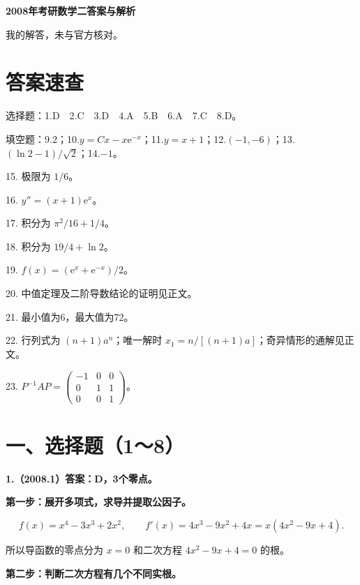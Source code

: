 \documentclass[UTF8,11pt,fontset=windows]{ctexart}
\begin{document}
{\LARGE\bfseries 2008年考研数学二答案与解析\par}\vspace{6pt}

\begingroup\color{gray}我的解答，未与官方核对。\par\endgroup

\section*{答案速查}

\begingroup\color{gray}选择题：1.D　2.C　3.D　4.A　5.B　6.A　7.C　8.D。\par\endgroup

\begingroup\color{gray}填空题：9.$2$；10.$y=Cx-x\mathrm e^{-x}$；11.$y=x+1$；12.$(-1,-6)$；13.$(\ln2-1)/\sqrt2$；14.$-1$。\par\endgroup

15. 极限为 $1/6$。

16. $y''=(x+1)\mathrm e^x$。

17. 积分为 $\pi^2/16+1/4$。

18. 积分为 $19/4+\ln2$。

19. $f(x)=(\mathrm e^x+\mathrm e^{-x})/2$。

20. 中值定理及二阶导数结论的证明见正文。

21. 最小值为6，最大值为72。

22. 行列式为 $(n+1)a^n$；唯一解时 $x_1=n/[(n+1)a]$；奇异情形的通解见正文。

23. $P^{-1}AP=\begin{pmatrix}-1&0&0\\0&1&1\\0&0&1\end{pmatrix}$。

\clearpage

\section*{一、选择题（1～8）}

\textbf{1.（2008.1）答案：D，3个零点。}

\textbf{第一步：展开多项式，求导并提取公因子。}

$$
f(x)=x^4-3x^3+2x^2,
\qquad f'(x)=4x^3-9x^2+4x=x(4x^2-9x+4).
$$

所以导函数的零点分为 $x=0$ 和二次方程 $4x^2-9x+4=0$ 的根。

\textbf{第二步：判断二次方程有几个不同实根。}
\end{document}
